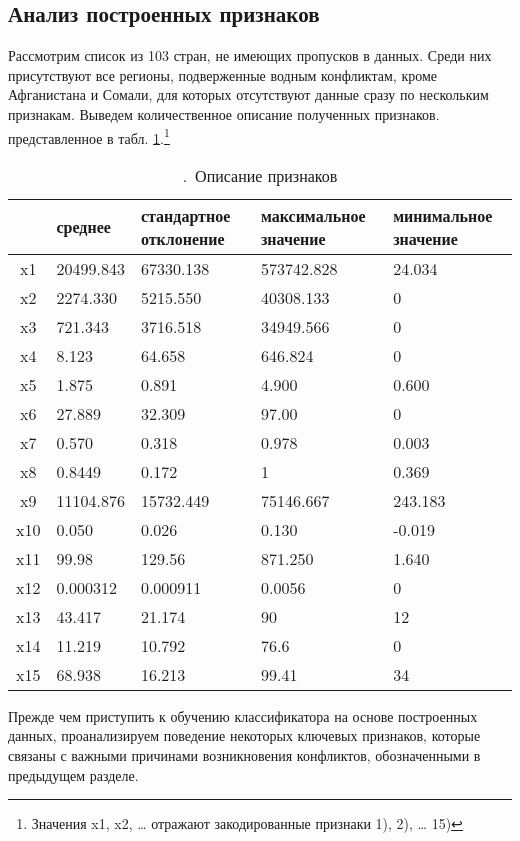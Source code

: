 \documentclass[a4paper, 12pt]{article}
\theoremstyle{plain} %
\theoremstyle{definition} %
\theoremstyle{remark} %
\begin{document}
\subsection{Анализ построенных признаков
}
Рассмотрим список из 103 стран, не имеющих пропусков в данных. Среди них присутствуют все регионы, подверженные водным конфликтам, кроме Афганистана и Сомали, для которых отсутствуют данные сразу по нескольким признакам. Выведем количественное описание полученных признаков. представленное в табл. \ref{tab:priznak}.\footnote{Значения x1, x2, … отражают закодированные признаки 1), 2), … 15)}
\begin{table}
	\centering
	\caption{.\, Описание признаков}
	\label{tab:priznak}
	\begin{tabularx}{\textwidth}{|c|X|X|X|X|}
		\hline
		& среднее       & стандартное отклонение      & максимальное значение       & минимальное значение    \\ \hline
		x1  & 20499.843 & 67330.138 & 573742.828 & 24.034  \\ \hline
		x2  & 2274.330  & 5215.550  & 40308.133  & 0       \\ \hline
		x3  & 721.343   & 3716.518  & 34949.566  & 0       \\ \hline
		x4  & 8.123     & 64.658    & 646.824    & 0       \\ \hline
		x5  & 1.875     & 0.891     & 4.900      & 0.600   \\ \hline
		x6  & 27.889    & 32.309    & 97.00      & 0       \\ \hline
		x7  & 0.570     & 0.318     & 0.978      & 0.003   \\ \hline
		x8  & 0.8449    & 0.172     & 1          & 0.369   \\ \hline
		x9  & 11104.876 & 15732.449 & 75146.667  & 243.183 \\ \hline
		x10 & 0.050     & 0.026     & 0.130      & -0.019  \\ \hline
		x11 & 99.98     & 129.56    & 871.250    & 1.640   \\ \hline
		x12 & 0.000312  & 0.000911  & 0.0056     & 0       \\ \hline
		x13 & 43.417    & 21.174    & 90         & 12      \\ \hline
		x14 & 11.219    & 10.792    & 76.6       & 0       \\ \hline
		x15 & 68.938    & 16.213    & 99.41      & 34      \\ \hline
	\end{tabularx}
\end{table}
Прежде чем приступить к обучению классификатора на основе построенных данных, проанализируем поведение некоторых ключевых признаков, которые связаны с важными причинами возникновения конфликтов, обозначенными в предыдущем разделе. 
\end{document}
